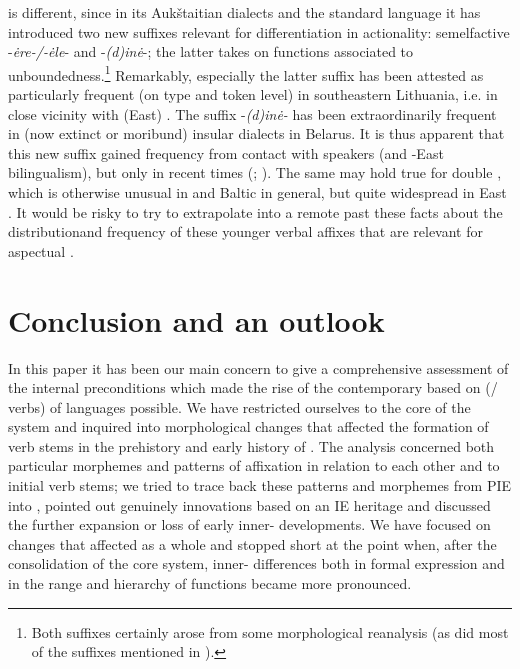 \documentclass[output=paper]{langsci/langscibook}
\begin{document}
 is different, since in its Aukštaitian dialects and the standard language it has introduced two new suffixes relevant for differentiation in actionality: semelfactive -\textit{\.ere-/-\.ele}- and -\textit{(d)in\.e}-; the latter takes on functions associated to unboundedness.\footnote{Both suffixes certainly arose from some morphological reanalysis (as did most of the  suffixes mentioned in ).} Remarkably, especially the latter suffix has been attested as particularly frequent (on type and token level) in southeastern Lithuania, i.e. in close vicinity with (East) . The suffix -\textit{(d)in\.e-} has been extraordinarily frequent in (now extinct or moribund) insular dialects in Belarus. It is thus apparent that this new suffix gained frequency from contact with  speakers (and -East  bilingualism), but only in recent times (\citealt[359--363]{Wiemer2009}; \citealt[125--131]{Arkadiev2015}). The same may hold true for double , which is otherwise unusual in  and Baltic in general, but quite widespread in East . It would be risky to try to extrapolate into a remote past these facts about the distribution\largerpage and frequency of these younger verbal affixes that are relevant for aspectual . 

\section{Conclusion and an outlook}\label{sec:wiemerserzant:6}

In this paper it has been our main concern to give a comprehensive assessment of the internal preconditions which made the rise of the contemporary  based on  (/ verbs) of  languages possible. We have restricted ourselves to the core of the system and inquired into morphological changes that affected the formation of verb stems in the prehistory and early history of . The analysis concerned both particular morphemes and patterns of affixation in relation to each other and to initial verb stems; we tried to trace back these patterns and morphemes from PIE into , pointed out genuinely  innovations based on an IE heritage and discussed the further expansion or loss of early inner- developments. We have focused on changes that affected  as a whole and stopped short at the point when, after the consolidation of the core system, inner- differences both in formal expression and in the range and hierarchy of functions became more pronounced.
\end{document}
